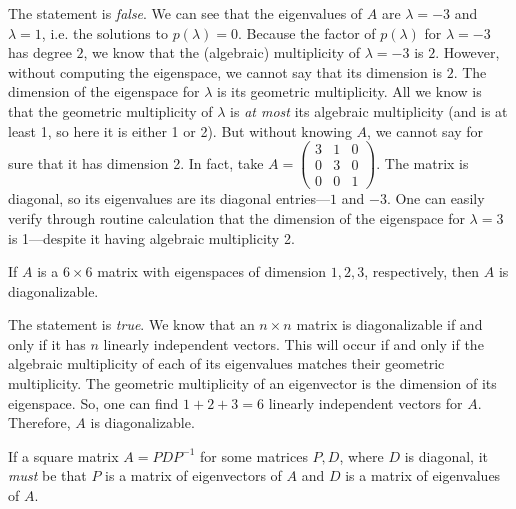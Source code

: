 \documentclass[11pt,letterpaper]{article}
\begin{document}
\sol The statement is \textit{false}. We can see that the eigenvalues of $A$ are $\lambda= -3$ and $\lambda= 1$, i.e. the solutions to $p(\lambda)= 0$. Because the factor of $p(\lambda)$ for $\lambda= -3$ has degree $2$, we know that the (algebraic) multiplicity of $\lambda= -3$ is $2$. However, without computing the eigenspace, we cannot say that its dimension is $2$. The dimension of the eigenspace for $\lambda$ is its geometric multiplicity. All we know is that the geometric multiplicity of $\lambda$ is \textit{at most} its algebraic multiplicity (and is at least 1, so here it is either 1 or 2). But without knowing $A$, we cannot say for sure that it has dimension 2. In fact, take $A= \begin{pmatrix} 3 & 1 & 0 \\ 0 & 3 & 0 \\ 0 & 0 & 1 \end{pmatrix}$. The matrix is diagonal, so its eigenvalues are its diagonal entries---$1$ and $-3$. One can easily verify through routine calculation that the dimension of the eigenspace for $\lambda= 3$ is 1---despite it having algebraic multiplicity 2. \pvspace{1.3cm}



 If $A$ is a $6 \times 6$ matrix with eigenspaces of dimension $1, 2, 3$, respectively, then $A$ is diagonalizable. \pspace

\sol The statement is \textit{true}. We know that an $n \times n$ matrix is diagonalizable if and only if it has $n$ linearly independent vectors. This will occur if and only if the algebraic multiplicity of each of its eigenvalues matches their geometric multiplicity. The geometric multiplicity of an eigenvector is the dimension of its eigenspace. So, one can find $1 + 2 + 3= 6$ linearly independent vectors for $A$. Therefore, $A$ is diagonalizable. \pvspace{0.8cm}



 If a square matrix $A= PDP^{-1}$ for some matrices $P, D$, where $D$ is diagonal, it \textit{must} be that $P$ is a matrix of eigenvectors of $A$ and $D$ is a matrix of eigenvalues of $A$. \pspace
\end{document}
